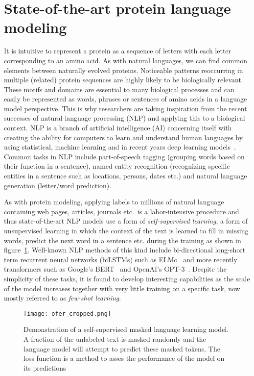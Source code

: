 \section{State-of-the-art protein language modeling}
\label{sec:nlp}
It is intuitive to represent a protein as a sequence of letters with each letter corresponding to an amino acid. As with natural languages, we can find common elements between naturally evolved proteins. Noticeable patterns reoccurring in multiple (related) protein sequences are highly likely to be biologically relevant. These motifs and domains are essential to many biological processes and can easily be represented as words, phrases or sentences of amino acids in a language model perspective. This is why researchers are taking inspiration from the recent successes of natural language processing (NLP) and applying this to a biological context. NLP is a branch of artificial intelligence (AI) concerning itself with creating the ability for computers to learn and understand human languages by using statistical, machine learning and in recent years deep learning models~\cite{Ofer}. Common tasks in NLP include part-of-speech tagging (grouping words based on their function in a sentence), named entity recognition (recognizing specific entities in a sentence such as locations, persons, dates etc.) and natural language generation (letter/word prediction).

As with protein modeling, applying labels to millions of natural language containing web pages, articles, journals etc.\ is a labor-intensive procedure and thus state-of-the-art NLP models use a form of \textit{self-supervised learning}, a form of unsupervised learning in which the context of the text is learned to fill in missing words, predict the next word in a sentence etc. during the training as shown in figure~\ref{fig:ofer}. Well-known NLP methods of this kind include bi-directional long-short term recurrent neural networks (biLSTMs) such as ELMo~\cite{elmo} and more recently transformers such as Google's BERT~\cite{bert} and OpenAI's GPT-3~\cite{gpt3}. Despite the simplicity of these tasks, it is found to develop interesting capabilities as the scale of the model increases together with very little training on a specific task, now mostly referred to as \textit{few-shot learning}.

\begin{figure}[h]
    \centering
    \texttt{[image: ofer\_cropped.png]}
    \caption{Demonstration of a self-supervised masked language learning model. A fraction of the unlabeled text is masked randomly and the language model will attempt to predict these masked tokens. The loss function is a method to asses the performance of the model on its predictions}
    \label{fig:ofer}
\end{figure}

